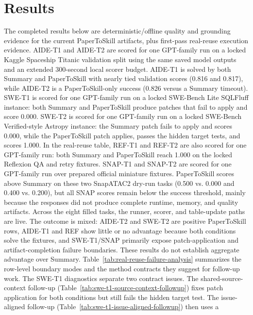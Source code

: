 \documentclass[letterpaper]{article}
\begin{document}


\section{Results}

The completed results below are deterministic/offline quality and grounding
evidence for the current PaperToSkill artifacts, plus first-pass real-reuse
execution evidence. AIDE-T1 and AIDE-T2 are scored for one GPT-family run on a
locked Kaggle Spaceship Titanic validation split using the same saved model
outputs and an extended 300-second local scorer budget. AIDE-T1 is solved by
both Summary and PaperToSkill with nearly tied validation scores (0.816 and
0.817), while AIDE-T2 is a PaperToSkill-only success (0.826 versus a Summary
timeout). SWE-T1 is scored for one GPT-family run on a locked
SWE-Bench Lite SQLFluff instance: both Summary and PaperToSkill produce patches
that fail to apply and score 0.000. SWE-T2 is scored for one GPT-family run on
a locked SWE-Bench Verified-style Astropy instance: the Summary patch fails to
apply and scores 0.000, while the PaperToSkill patch applies, passes the hidden
target tests, and scores 1.000. In the real-reuse table, REF-T1 and REF-T2 are
also scored for one GPT-family run: both Summary and PaperToSkill reach 1.000
on the locked Reflexion QA and retry fixtures. SNAP-T1 and SNAP-T2 are scored
for one GPT-family run over prepared official miniature fixtures. PaperToSkill
scores above Summary on these two SnapATAC2 dry-run tasks (0.500 vs. 0.000 and
0.400 vs. 0.200), but all SNAP scores remain below the success threshold,
mainly because the responses did not produce complete runtime, memory, and
quality artifacts. Across the eight filled tasks, the runner, scorer, and
table-update paths are live. The outcome is mixed: AIDE-T2 and SWE-T2 are
positive PaperToSkill rows, AIDE-T1 and REF show little or no advantage because
both conditions solve the fixtures, and SWE-T1/SNAP primarily expose
patch-application and artifact-completion failure boundaries. These results do
not establish
aggregate advantage over Summary. Table~\ref{tab:real-reuse-failure-analysis}
summarizes the row-level boundary modes and the method contracts they suggest
for follow-up work. The SWE-T1 diagnostics separate two contract issues. The
shared-source-context follow-up
(Table~\ref{tab:swe-t1-source-context-followup}) fixes patch application for
both conditions but still fails the hidden target test. The issue-aligned
follow-up (Table~\ref{tab:swe-t1-issue-aligned-followup}) then uses a
\end{document}
